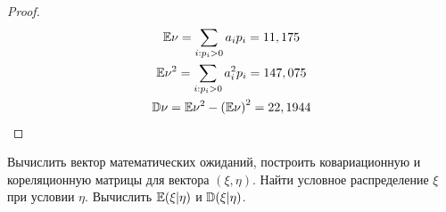 \begin{proof}
\begin{gather*}
    \mathbb E\nu = \sum_{i: p_i > 0}a_ip_i = 11,175\\
    \mathbb E\nu^2 = \sum_{i: p_i > 0}a_i^2p_i = 147,075\\
    \mathbb D\nu = \mathbb E\nu^2 - \left(\mathbb E\nu\right)^2 = 22,1944
\end{gather*}
\end{proof}

\begin{problem}
Вычислить вектор математических ожиданий, построить ковариационную и кореляционную матрицы для вектора $(\xi,\eta)$. Найти условное распределение $\xi$ при условии $\eta$. Вычислить $\mathbb E(\xi | \eta)$ и $\mathbb D(\xi | \eta)$.
\end{problem}

